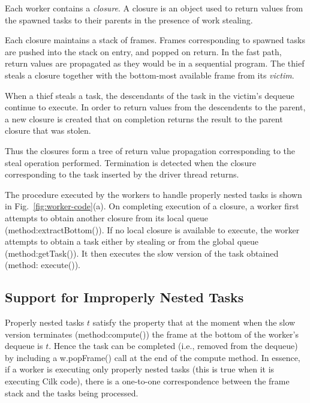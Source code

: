 Each worker contains a {\em closure}. A closure is an  object used
to return values from the spawned tasks to their parents in the
presence of work stealing.  

Each closure maintains a stack of frames. Frames corresponding to
spawned tasks are pushed into the stack on entry, and popped on
return. In the fast path, return values are propagated as they would
be in a sequential program. The thief steals a closure together with
the bottom-most available frame from its
{\em victim}.

When a thief steals a task, the descendants of the task in the
victim's dequeue continue to execute.  In order to return values from
the descendents to the parent, a new closure is created that on
completion returns the result to the parent closure that was stolen.

Thus the closures form a tree of return value propagation
corresponding to the steal operation performed. Termination is
detected when the closure corresponding to the task inserted by the
driver thread returns. 

The procedure executed by the workers to handle properly nested tasks
is shown in Fig.~\ref{fig:worker-code}(a). On completing execution of
a closure, a worker first attempts to obtain another closure from its
local queue (method:{\java extractBottom()}). If no local closure is
available to execute, the worker attempts to obtain a task either by
stealing or from the global queue (method:{\java getTask()}). It then
executes the slow version of the task obtained (method:{\java
  execute()}). 

\subsection{Support for Improperly Nested Tasks}

Properly nested tasks $t$ satisfy the property that at the moment when
the slow version terminates (method:{\java compute()}) the frame at
the bottom of the worker's dequeue is $t$. Hence the task can be
completed (i.e., removed from the dequeue) by including a {\java
w.popFrame()} call at the end of the compute method. In essence, if a
worker is executing only properly nested tasks (this is true when it
is executing Cilk code), there is a one-to-one correspondence between
the frame stack and the tasks being processed.

